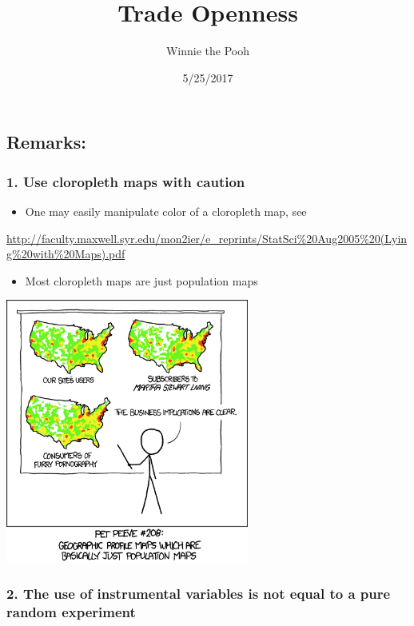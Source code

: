 \documentclass[english,]{article}
\title{Trade Openness}
\author{Winnie the Pooh}
\date{5/25/2017}
\providecommand{\tightlist}{%
  \setlength{\itemsep}{0pt}\setlength{\parskip}{0pt}}
\begin{document}
\maketitle

\subsection{Remarks:}\label{remarks}

\subsubsection{1. Use cloropleth maps with
caution}\label{use-cloropleth-maps-with-caution}

\begin{itemize}
\tightlist
\item
  One may easily manipulate color of a cloropleth map, see
\end{itemize}

\url{http://faculty.maxwell.syr.edu/mon2ier/e_reprints/StatSci%20Aug2005%20(Lying%20with%20Maps).pdf}

\begin{itemize}
\tightlist
\item
  Most cloropleth maps are just population maps
\end{itemize}

\includegraphics[width=8cm]{heatmap_2x.png}

\subsubsection{2. The use of instrumental variables is not equal to a
pure random
experiment}\label{the-use-of-instrumental-variables-is-not-equal-to-a-pure-random-experiment}
\end{document}
